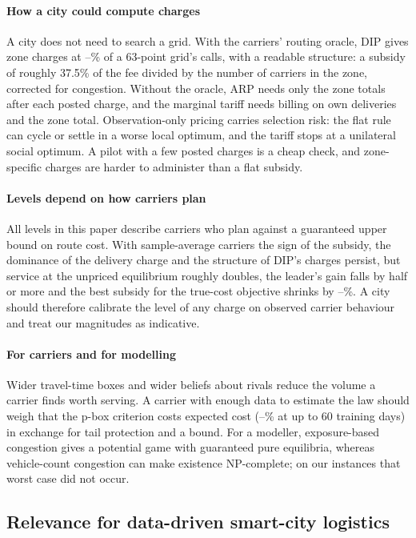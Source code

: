 \documentclass[preprint,12pt]{elsarticle}
\theoremstyle{definition}
\theoremstyle{remark}
\begin{document}
\paragraph{How a city could compute charges} A city does not need to search a grid. With the carriers' routing oracle, DIP gives zone charges at \TenDipCallsNewDelhi--\TenDipCallsLondon\% of a 63-point grid's calls, with a readable structure: a subsidy of roughly 37.5\% of the fee divided by the number of carriers in the zone, corrected for congestion. Without the oracle, ARP needs only the zone totals after each posted charge, and the marginal tariff needs billing on own deliveries and the zone total. Observation-only pricing carries selection risk: the flat rule can cycle or settle in a worse local optimum, and the tariff stops at a unilateral social optimum. A pilot with a few posted charges is a cheap check, and zone-specific charges are harder to administer than a flat subsidy.

\paragraph{Levels depend on how carriers plan} All levels in this paper describe carriers who plan against a guaranteed upper bound on route cost. With sample-average carriers the sign of the subsidy, the dominance of the delivery charge and the structure of DIP's charges persist, but service at the unpriced equilibrium roughly doubles, the leader's gain falls by half or more and the best subsidy for the true-cost objective shrinks by \CritChargeDropMin--\CritChargeDropMax\%. A city should therefore calibrate the level of any charge on observed carrier behaviour and treat our magnitudes as indicative.

\paragraph{For carriers and for modelling} Wider travel-time boxes and wider beliefs about rivals reduce the volume a carrier finds worth serving. A carrier with enough data to estimate the law should weigh that the p-box criterion costs expected cost (\AmbRegMin--\AmbRegMax\% at up to 60 training days) in exchange for tail protection and a bound. For a modeller, exposure-based congestion gives a potential game with guaranteed pure equilibria, whereas vehicle-count congestion can make existence NP-complete; on our instances that worst case did not occur.

\subsection{Relevance for data-driven smart-city logistics}
\end{document}
